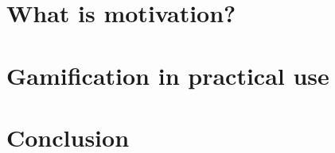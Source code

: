 \documentclass[10pt,twoside,english,a4paper]{article}
\begin{document}
\section{What is motivation?} \label{section4}




\section{Gamification in practical use} \label{section5}




\section{Conclusion} \label{section6} %






\end{document}
